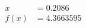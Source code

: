 \documentclass[preview]{standalone}
\begin{document}
\begin{align*}
x &= 0.2086\\f(x) &= 4.3663595
\end{align*}
\end{document}
